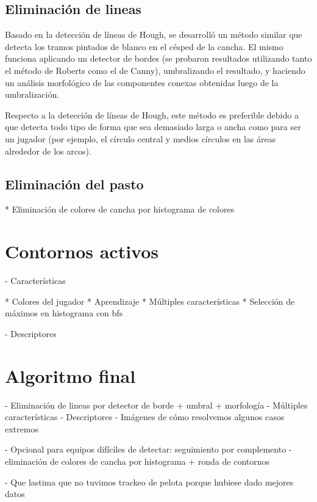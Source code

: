 
\subsection{Eliminación de lineas}

Basado en la detección de líneas de Hough, se desarrolló un método similar que
detecta los tramos pintados de blanco en el césped de la cancha. El mismo
funciona aplicando un detector de bordes (se probaron resultados utilizando
tanto el método de Roberts como el de Canny), umbralizando el resultado, y
haciendo un análisis morfológico de las componentes conexas obtenidas luego de
la umbralización.

Respecto a la detección de líneas de Hough, este método es preferible debido
a que detecta todo tipo de forma que sea demasiado larga o ancha como para
ser un jugador (por ejemplo, el círculo central y medios círculos en las
áreas alrededor de los arcos).

\subsection{Eliminación del pasto}
  * Eliminación de colores de cancha por histograma de colores

\section{Contornos activos}
\label{sec:ac-extension}

- Características

  * Colores del jugador
  * Aprendizaje
  * Múltiples características
  * Selección de máximos en histograma con bfs

- Descriptores

\section{Algoritmo final}
\label{sec:alg-final}

- Eliminación de lineas por detector de borde + umbral + morfología
- Múltiples características
- Descriptores
- Imágenes de cómo resolvemos algunos casos extremos

- Opcional para equipos difíciles de detectar: seguimiento por complemento
  - eliminación de colores de cancha por histograma + ronda de contornos

- Que lastima que no tuvimos trackeo de pelota porque hubiese dado mejores datos
